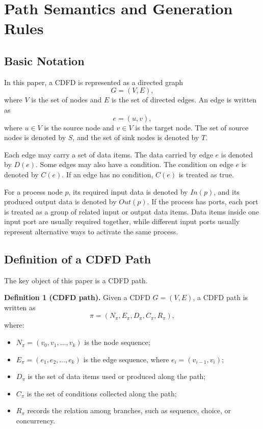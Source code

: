 \documentclass[conference]{template/IEEEtran}
\begin{document}
\section{Path Semantics and Generation Rules}

\subsection{Basic Notation}

In this paper, a CDFD is represented as a directed graph
\begin{equation}
G=(V,E),
\end{equation}
where \(V\) is the set of nodes and \(E\) is the set of directed edges. An edge is written as
\begin{equation}
e=(u,v),
\end{equation}
where \(u\in V\) is the source node and \(v\in V\) is the target node. The set of source nodes is denoted by \(S\), and the set of sink nodes is denoted by \(T\).

Each edge may carry a set of data items. The data carried by edge \(e\) is denoted by \(D(e)\). Some edges may also have a condition. The condition on edge \(e\) is denoted by \(C(e)\). If an edge has no condition, \(C(e)\) is treated as true.

For a process node \(p\), its required input data is denoted by \(In(p)\), and its produced output data is denoted by \(Out(p)\). If the process has ports, each port is treated as a group of related input or output data items. Data items inside one input port are usually required together, while different input ports usually represent alternative ways to activate the same process.

\subsection{Definition of a CDFD Path}

The key object of this paper is a CDFD path.

\textbf{Definition 1 (CDFD path).}
Given a CDFD \(G=(V,E)\), a CDFD path is written as
\begin{equation}
\pi=(N_\pi,E_\pi,D_\pi,C_\pi,R_\pi),
\end{equation}
where:
\begin{itemize}
\item \(N_\pi=(v_0,v_1,\ldots,v_k)\) is the node sequence;
\item \(E_\pi=(e_1,e_2,\ldots,e_k)\) is the edge sequence, where \(e_i=(v_{i-1},v_i)\);
\item \(D_\pi\) is the set of data items used or produced along the path;
\item \(C_\pi\) is the set of conditions collected along the path;
\item \(R_\pi\) records the relation among branches, such as sequence, choice, or concurrency.
\end{itemize}
\end{document}
